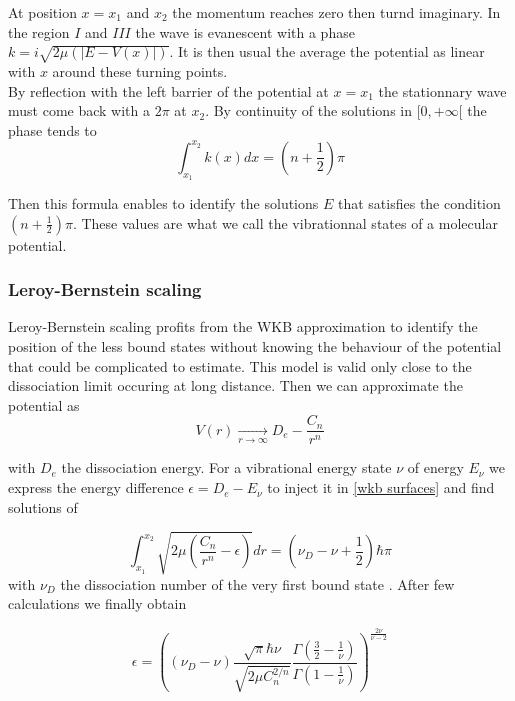 At position $x=x_1$ and $x_2$ the momentum reaches zero then turnd imaginary.
In the region $I$ and $III$ the wave is evanescent with a phase $k = i\sqrt{2\mu(|E-V(x)|)}$. It is then usual the
average the potential as linear with $x$ around these turning points. \\

By reflection with the left barrier of the potential at $x=x_1$ the stationnary wave must come back with a $2\pi$ at 
$x_2$. By continuity of the solutions in $[0, +\infty[$ the phase tends to
\begin{equation}
    \int_{x_1}^{x_2} k(x)dx = (n+\frac{1}{2})\pi 
    \label{wkb surfaces}
\end{equation}

Then this formula enables to identify the solutions $E$ that satisfies
the condition $(n+\frac{1}{2})\pi $. These values are what we call the vibrationnal states
of a molecular potential.

\subsubsection{Leroy-Bernstein scaling}
Leroy-Bernstein scaling profits from the WKB approximation to identify the position of the less 
bound states without knowing the behaviour of the potential that could be complicated to estimate.
This model is valid only close to the dissociation limit occuring at long distance. Then we can 
approximate the potential as
\begin{equation}
    V(r) \xrightarrow[r \to \infty]{} D_e - \frac{C_n}{r^n}
\end{equation}
 
with $D_e$ the dissociation energy. For a vibrational energy state $\nu$ of energy $E_{\nu}$
we express the energy difference $\epsilon = D_e - E_{\nu}$ to inject it in \ref{wkb surfaces}
and find solutions of

\begin{equation}
    \int_{x_1}^{x_2} \sqrt{2\mu(\frac{C_n}{r^n}-\epsilon)} dr = (\nu_D-\nu +\frac{1}{2})\hbar\pi 
\end{equation}
with $\nu_D$ the dissociation number of the very first bound state \cite{brown_rotational_nodate}. After few calculations we finally obtain

\begin{equation}
    \epsilon = \left((\nu_D-\nu)\frac{\sqrt{\pi }\hbar\nu}{\sqrt{2\mu C_n^{2/n}}}\frac{\Gamma(\frac{3}{2} - \frac{1}{\nu})}{\Gamma(1-\frac{1}{\nu})} \right)^\frac{2\nu}{\nu-2}
\end{equation}

